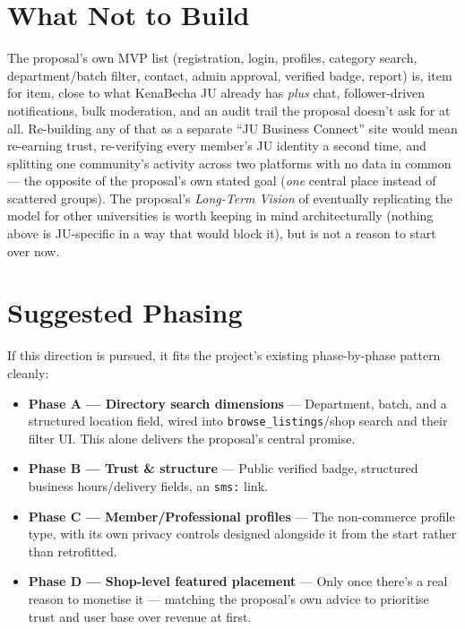 \documentclass[11pt]{article}
\newcommand{\feature}[2]{%
  \item \textbf{#1} --- #2
}
\begin{document}
\section{What Not to Build}

The proposal's own MVP list (registration, login, profiles, category search, department/batch filter, contact, admin approval, verified badge, report) is, item for item, close to what KenaBecha JU already has \emph{plus} chat, follower-driven notifications, bulk moderation, and an audit trail the proposal doesn't ask for at all. Re-building any of that as a separate ``JU Business Connect'' site would mean re-earning trust, re-verifying every member's JU identity a second time, and splitting one community's activity across two platforms with no data in common --- the opposite of the proposal's own stated goal (\emph{one} central place instead of scattered groups). The proposal's \emph{Long-Term Vision} of eventually replicating the model for other universities is worth keeping in mind architecturally (nothing above is JU-specific in a way that would block it), but is not a reason to start over now.

\section{Suggested Phasing}

If this direction is pursued, it fits the project's existing phase-by-phase pattern cleanly:

\begin{itemize}
  \feature{Phase A --- Directory search dimensions}{Department, batch, and a structured location field, wired into \texttt{browse\_listings}/shop search and their filter UI. This alone delivers the proposal's central promise.}
  \feature{Phase B --- Trust \& structure}{Public verified badge, structured business hours/delivery fields, an \texttt{sms:} link.}
  \feature{Phase C --- Member/Professional profiles}{The non-commerce profile type, with its own privacy controls designed alongside it from the start rather than retrofitted.}
  \feature{Phase D --- Shop-level featured placement}{Only once there's a real reason to monetise it --- matching the proposal's own advice to prioritise trust and user base over revenue at first.}
\end{itemize}
\end{document}
